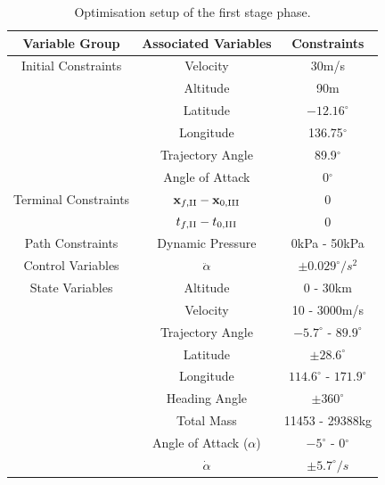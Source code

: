\begin{table}[ht]
\centering
\begin{tabular}{|c|c|c|}
	\hline \textbf{Variable Group}  & \textbf{Associated Variables} & \textbf{Constraints}\\
	\hline Initial Constraints  & Velocity & 30m/s\\ & Altitude& 90m \\ & Latitude & $-12.16^\circ$ \\& Longitude & 136.75$^\circ$\\ & Trajectory Angle & 89.9$^\circ$\\ & Angle of Attack& 0$^\circ$\\
	\hline Terminal Constraints & $\textbf{x}_{f,\textrm{\rom{2}}} - \textbf{x}_{0,\textrm{\rom{3}}}$ & 0\\ & $t_{f,\textrm{\rom{2}}} - t_{0,\textrm{\rom{3}}}$ & 0\\
	\hline Path Constraints & Dynamic Pressure & 0kPa - 50kPa\\ 
		\hline Control Variables & $\ddot{\alpha}$ & $\pm0.029^\circ/s^2$\\ 
		\hline State Variables & Altitude & 0 - 30km\\ & Velocity& 10 - 3000m/s\\ & Trajectory Angle& $-5.7^\circ$ - $89.9^\circ$ \\   & Latitude& $\pm28.6^\circ$ \\  & Longitude& $114.6^\circ$ - $171.9^\circ$\\   & Heading Angle& $\pm360^\circ$\\  & Total Mass& 11453 - 29388kg \\  & Angle of Attack ($\alpha$)&  $-5^\circ$ - 0$^\circ$\\  & $\dot{\alpha}$& $\pm5.7^\circ/s$\\ 
	\hline 
\end{tabular} 

\caption{Optimisation setup of the first stage phase. }

\end{table}



